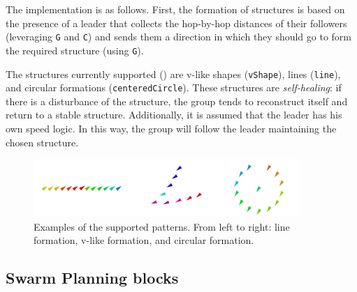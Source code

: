 The implementation is as follows. First, the formation of structures is based on the presence of a leader that
collects the hop-by-hop distances 
 of their followers (leveraging \lstinline|G| and \lstinline|C|) and
 sends them a direction in which they should go to form the required structure (using \lstinline|G|).

The structures currently supported () are v-like shapes (\lstinline|vShape|), lines (\lstinline|line|), and circular formations (\lstinline|centeredCircle|). 
 These structures are \emph{self-healing}: if there is a disturbance 
 of the structure, 
 the group tends to reconstruct itself and return to a stable structure. 
Additionally, it is assumed that the leader has his own speed logic. 
 In this way,
 the group will follow the leader maintaining the chosen structure. 
\begin{figure}[t]
  \centering
  \includegraphics[width=0.9\textwidth]{papers/coordination2023-macro/images/shapes.png}
  \caption{Examples of the supported patterns. From left to right: 
   line formation, v-like formation, and
   circular formation.
  }
   \label{coordination2023-macro:fig:formations}
\end{figure}
  
\subsection{Swarm Planning blocks}\label{coordination2023-macro:subsec:planner} %

